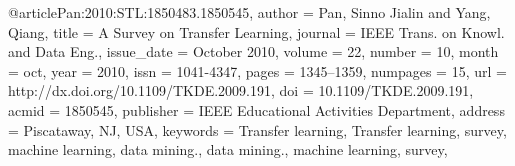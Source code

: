 @article{Pan:2010:STL:1850483.1850545,
 author = {Pan, Sinno Jialin and Yang, Qiang},
 title = {A Survey on Transfer Learning},
 journal = {IEEE Trans. on Knowl. and Data Eng.},
 issue_date = {October 2010},
 volume = {22},
 number = {10},
 month = oct,
 year = {2010},
 issn = {1041-4347},
 pages = {1345--1359},
 numpages = {15},
 url = {http://dx.doi.org/10.1109/TKDE.2009.191},
 doi = {10.1109/TKDE.2009.191},
 acmid = {1850545},
 publisher = {IEEE Educational Activities Department},
 address = {Piscataway, NJ, USA},
 keywords = {Transfer learning, Transfer learning, survey, machine learning, data mining., data mining., machine learning, survey},
} 